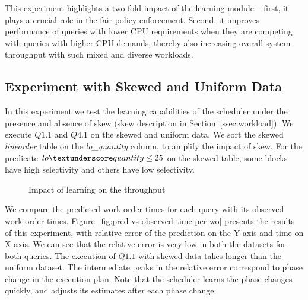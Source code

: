 This experiment highlights a two-fold impact of the learning module -- first, it plays a crucial role in the fair policy enforcement. 
Second, it improves performance of queries with lower CPU requirements when they are competing with queries with higher CPU demands, thereby also increasing overall system throughput with such mixed and diverse workloads. 

\subsection{Experiment with Skewed and Uniform Data}
In this experiment we test the learning capabilities of the \sys{} scheduler under the presence and absence of skew (skew description in Section~\ref{ssec:workload}).
We execute $Q1.1$ and $Q4.1$ on the skewed and uniform data.
We sort the skewed \textit{lineorder} table on the \textit{lo\_quantity} column, to amplify the impact of skew. 
For the predicate $lo\textunderscore quantity \leq 25$ on the skewed table, some blocks have high selectivity and others have low selectivity.

\begin{figure}[t]
	\centering
	\vspace{-0.6em}
	\caption{Impact of learning on the throughput}
	\label{fig:q11-q41-throughput}
	\vspace{-1em}
\end{figure}
	
We compare the predicted work order times for each query with its observed work order times. %
Figure~\ref{fig:pred-vs-observed-time-per-wo} presents the results of this experiment, with relative error of the prediction on the Y-axis and time on X-axis.
We can see that the relative error is very low in both the datasets for both queries. 
The execution of $Q1.1$ with skewed data takes longer than the uniform dataset.
The intermediate peaks in the relative error correspond to phase change in the execution plan. 
Note that the scheduler learns the phase changes quickly, and adjusts its estimates after each phase change. 

